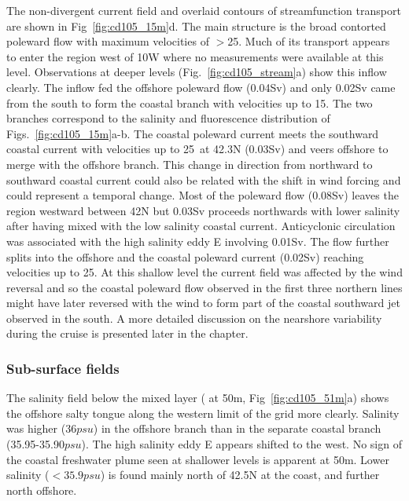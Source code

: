 The non-divergent current field and overlaid contours of
streamfunction transport are shown in Fig~\ref{fig:cd105_15m}d.
The main structure is the broad contorted poleward flow with
maximum velocities of $>$25\velc. Much of its transport appears to
enter the region west of 10\deg W where no measurements were
available at this level. Observations at deeper levels
(Fig.~\ref{fig:cd105_stream}a) show this inflow clearly. The
inflow fed the offshore poleward flow (0.04Sv) and only 0.02Sv
came from the south to form the coastal branch with velocities up
to 15\velc. The two branches correspond to the salinity and
fluorescence distribution of Figs.~\ref{fig:cd105_15m}a-b. The
coastal poleward current meets the southward coastal current with
velocities up to 25\velc\ at 42.3\deg N (0.03Sv) and veers
offshore to merge with the offshore branch. This change in
direction from northward to southward coastal current could also
be related with the shift in wind forcing and could represent a
temporal change. Most of the poleward flow (0.08Sv) leaves the
region westward between 42\deg N but 0.03Sv proceeds
northwards with lower salinity after having mixed with the low
salinity coastal current. Anticyclonic circulation was associated
with the high salinity eddy E involving 0.01Sv. The flow further
splits into the offshore and the coastal poleward current (0.02Sv)
reaching velocities up to 25\velc. At this shallow level the
current field was affected by the wind reversal and so the coastal
poleward flow observed in the first three northern lines might
have later reversed with the wind to form part of the coastal
southward jet observed in the south. A more detailed discussion on
the nearshore variability during the cruise is presented later in
the chapter.

\subsubsection{Sub-surface fields}

The salinity field below the mixed layer ( at 50m,
Fig~\ref{fig:cd105_51m}a) shows the offshore salty tongue along
the western limit of the grid more clearly. Salinity was higher
(36$psu$) in the offshore branch than in the separate coastal
branch (35.95-35.90$psu$). The high salinity eddy E appears
shifted to the west. No sign of the coastal freshwater plume seen
at shallower levels is apparent at 50m. Lower salinity
($<35.9psu$) is found mainly north of 42.5\deg N at the coast, and
further north offshore.

